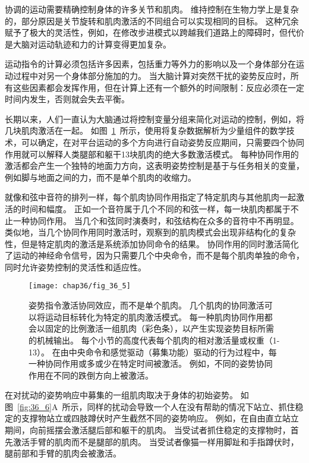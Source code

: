 \begin{proposition}[肌肉的协同激活] \label{box:36_2}
	
	\quad \quad 协调的运动需要精确控制身体的许多关节和肌肉。
	维持控制在生物力学上是复杂的，部分原因是关节旋转和肌肉激活的不同组合可以实现相同的目标。
	这种冗余赋予了极大的灵活性，例如，在修改步进模式以跨越我们道路上的障碍时，但代价是大脑对运动轨迹和力的计算变得更加复杂。
	
	\quad \quad 运动指令的计算必须包括许多因素，包括重力等外力的影响以及一个身体部分在运动过程中对另一个身体部分施加的力。
	当大脑计算对突然干扰的姿势反应时，所有这些因素都会发挥作用，但在计算上还有一个额外的时间限制：反应必须在一定时间内发生，否则就会失去平衡。
	
	\quad \quad 长期以来，人们一直认为大脑通过将控制变量分组来简化对运动的控制，例如，将几块肌肉激活在一起。
	如图~\ref{fig:36_5}~所示，使用将复杂数据解析为少量组件的数学技术，可以确定，在对平台运动的多个方向进行自动姿势反应期间，只需要四个协同作用就可以解释人类腿部和躯干13块肌肉的绝大多数激活模式。
	每种协同作用的激活都会产生一个独特的地面力方向，这表明姿势控制是基于与任务相关的变量，例如脚与地面之间的力，而不是单个肌肉的收缩力。
	
	\quad \quad 就像和弦中音符的排列一样，每个肌肉协同作用指定了特定肌肉与其他肌肉一起激活的时间和幅度。
	正如一个音符属于几个不同的和弦一样，每一块肌肉都属于不止一种协同作用。
	当几个和弦同时演奏时，和弦结构在众多的音符中不再明显。
	类似地，当几个协同作用同时激活时，观察到的肌肉模式会出现非结构化的复杂性，但是特定肌肉的激活是系统添加协同命令的结果。
	协同作用的同时激活简化了运动的神经命令信号，因为只需要几个中央命令，而不是每个肌肉单独的命令，同时允许姿势控制的灵活性和适应性。
	
\end{proposition}


\begin{figure}[htbp]
	\centering
	\texttt{[image: chap36/fig\_36\_5]}
	\caption{姿势指令激活协同效应，而不是单个肌肉。
		几个肌肉的协同激活可以将运动目标转化为特定的肌肉激活模式。
		每一种肌肉协同作用都会以固定的比例激活一组肌肉（彩色条），以产生实现姿势目标所需的机械输出。
		每个小节的高度代表每个肌肉的相对激活量或权重（1-13）。
		在由中央命令和感觉驱动（募集功能）驱动的行为过程中，每一种协同作用或多或少在特定时间被激活。
		例如，不同的姿势协同作用在不同的跌倒方向上被激活。}
	\label{fig:36_5}
\end{figure}


在对扰动的姿势响应中募集的一组肌肉取决于身体的初始姿势。
如图~\ref{fig:36_6}A~所示，同样的扰动会导致一个人在没有帮助的情况下站立、抓住稳定的支撑物站立或四肢蹲伏时产生截然不同的姿势响应。
例如，在自由直立站立期间，向前摇摆会激活腿后部和躯干的肌肉。
当受试者抓住稳定的支撑物时，首先激活手臂的肌肉而不是腿部的肌肉。
当受试者像猫一样用脚趾和手指蹲伏时，腿前部和手臂的肌肉会被激活。


